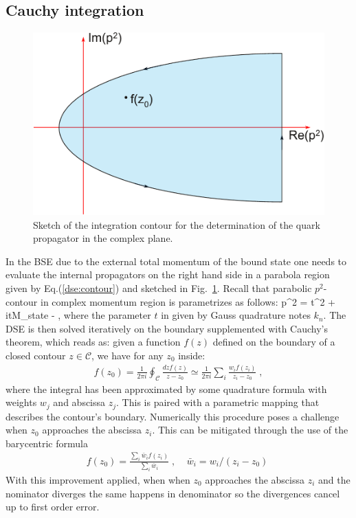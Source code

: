 \subsection*{Cauchy integration}
\begin{figure}[!b]
\begin{center}
\includegraphics[width=0.8\columnwidth]{figures/contour}
\caption{Sketch of the integration contour for the determination of the quark propagator in
the complex plane.}\label{fig:contour1}
\end{center}
\end{figure}
%
In the BSE due to the external total momentum of the bound state one needs to evaluate the
internal propagators on the right hand side in a parabola region given by Eq.(\ref{dse:contour}) and sketched in Fig.~\ref{fig:contour1}.
Recall that parabolic $p^2$-contour in complex momentum region is parametrizes as follows:
\beqa
	p^2 = t^2 + itM_{state} - \;,
	\label{dse:app_contour}
\eeqa
where the parameter $t$ in given by Gauss quadrature notes $k_n$.
The DSE is then solved iteratively on the boundary supplemented
with Cauchy's theorem, which reads as: given a function $f(z)$ defined on the 
boundary of a closed contour $z\in\mathcal{C}$, we have for any $z_0$ inside:
%
\begin{align}\label{eqn:cauchy}
f(z_0) = \frac{1}{2\pi i} \oint_{\mathcal{C}} \frac{dz f(z)}{z-z_0}\simeq \frac{1}{2\pi i} \sum_{i} \frac{w_i f(z_i)}{z_i-z_0}\;,
\end{align}
%
where the integral has been approximated by some quadrature formula with weights $w_j$ and 
abscissa $z_j$. This is paired with a parametric mapping that describes the contour's boundary.
Numerically this procedure poses a challenge when $z_0$ approaches the abscissa $z_i$. This can be 
mitigated through the use of the barycentric formula~\cite{Berrut_barycentriclagrange}
%
\begin{align}\label{eqn:cauchybary}
f(z_0) = \frac{\sum_{i} \bar{w}_i f(z_i)  }{\sum_{i} \bar{w}_i }\;,\;\;\;\;\bar{w}_i=w_i /\left(z_i-z_0\right)\;
\end{align}
%
%
With this improvement applied, when when $z_0$ approaches the abscissa $z_i$ and the nominator diverges the same happens in denominator so the divergences cancel up to first order error. 

